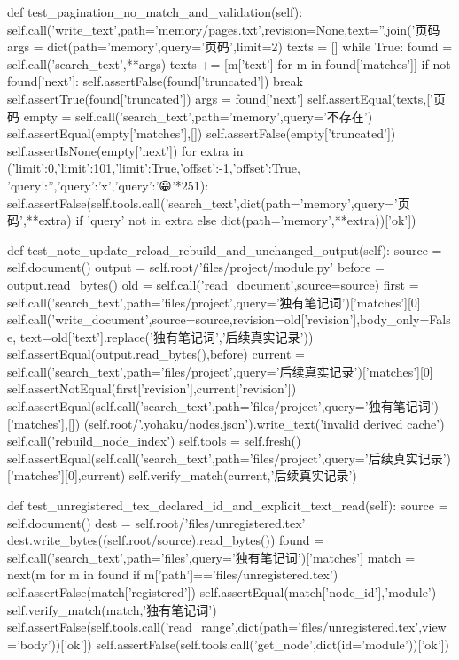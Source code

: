     def test_pagination_no_match_and_validation(self):
        self.call('write_text',path='memory/pages.txt',revision=None,text=''.join('页码%
        args = dict(path='memory',query='页码',limit=2)
        texts = []
        while True:
            found = self.call('search_text',**args)
            texts += [m['text'] for m in found['matches']]
            if not found['next']:
                self.assertFalse(found['truncated'])
                break
            self.assertTrue(found['truncated'])
            args = found['next']
        self.assertEqual(texts,['页码%
        empty = self.call('search_text',path='memory',query='不存在')
        self.assertEqual(empty['matches'],[])
        self.assertFalse(empty['truncated'])
        self.assertIsNone(empty['next'])
        for extra in ({'limit':0},{'limit':101},{'limit':True},{'offset':-1},{'offset':True},
                      {'query':''},{'query':'x\ny'},{'query':'😀'*251}):
            self.assertFalse(self.tools.call('search_text',dict(path='memory',query='页码',**extra) if 'query' not in extra else dict(path='memory',**extra))['ok'])

    def test_note_update_reload_rebuild_and_unchanged_output(self):
        source = self.document()
        output = self.root/'files/project/module.py'
        before = output.read_bytes()
        old = self.call('read_document',source=source)
        first = self.call('search_text',path='files/project',query='独有笔记词')['matches'][0]
        self.call('write_document',source=source,revision=old['revision'],body_only=False,
                  text=old['text'].replace('独有笔记词','后续真实记录'))
        self.assertEqual(output.read_bytes(),before)
        current = self.call('search_text',path='files/project',query='后续真实记录')['matches'][0]
        self.assertNotEqual(first['revision'],current['revision'])
        self.assertEqual(self.call('search_text',path='files/project',query='独有笔记词')['matches'],[])
        (self.root/'.yohaku/nodes.json').write_text('invalid derived cache')
        self.call('rebuild_node_index')
        self.tools = self.fresh()
        self.assertEqual(self.call('search_text',path='files/project',query='后续真实记录')['matches'][0],current)
        self.verify_match(current,'后续真实记录')

    def test_unregistered_tex_declared_id_and_explicit_text_read(self):
        source = self.document()
        dest = self.root/'files/unregistered.tex'
        dest.write_bytes((self.root/source).read_bytes())
        found = self.call('search_text',path='files',query='独有笔记词')['matches']
        match = next(m for m in found if m['path']=='files/unregistered.tex')
        self.assertFalse(match['registered'])
        self.assertEqual(match['node_id'],'module')
        self.verify_match(match,'独有笔记词')
        self.assertFalse(self.tools.call('read_range',dict(path='files/unregistered.tex',view='body'))['ok'])
        self.assertFalse(self.tools.call('get_node',dict(id='module'))['ok'])

